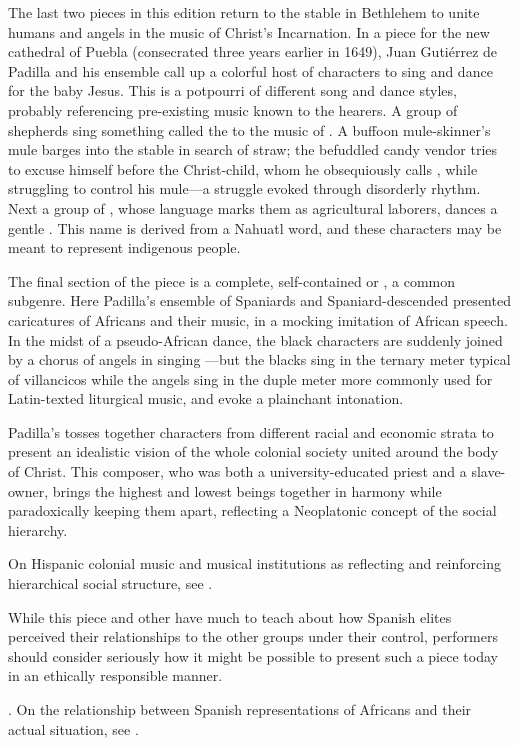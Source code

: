 The last two pieces in this edition return to the stable in Bethlehem to unite 
humans and angels in the music of Christ's Incarnation.
In a piece for the new cathedral of Puebla (consecrated three years earlier in 
1649), Juan Gutiérrez de Padilla and his ensemble call up a colorful host of
characters  to sing and dance for the baby
Jesus.%
    \Autocite[406--467]{Cashner:PhD}
This  is a potpourri of different song and dance styles, 
probably referencing pre-existing music known to the hearers.
A group of shepherds sing something called the  to the music 
of .
A buffoon mule-skinner's mule barges into the stable in search of straw; the 
befuddled candy vendor tries to excuse himself before the Christ-child, whom he 
obsequiously calls , while struggling to control his mule---a 
struggle evoked through disorderly rhythm.
Next a group of , whose language marks them as 
agricultural laborers, dances a gentle .
This name is derived from a Nahuatl word, and these characters may be meant to 
represent indigenous people.

The final section of the piece is a complete, self-contained  or 
, a common subgenre.
Here Padilla's ensemble of Spaniards and Spaniard-descended  
presented caricatures of Africans and their music, in a mocking imitation of 
African speech.
In the midst of a pseudo-African dance, the black characters are suddenly 
joined by a chorus of angels in singing ---but the blacks sing in 
the ternary meter typical of villancicos while the angels sing in the duple
meter more commonly used for Latin-texted liturgical music, and evoke a
plainchant intonation.

Padilla's  tosses together characters from different 
racial and economic strata to present an idealistic vision of the whole 
colonial society united around the body of Christ.
This composer, who was both a university-educated priest and a slave-owner,%
    \Autocite{Mauleon:PadillaPalafox}
brings the highest and lowest beings together in harmony while paradoxically
keeping them apart, reflecting a Neoplatonic concept of the social hierarchy.%
\begin{Footnote}
    On Hispanic colonial music and musical institutions as reflecting and
    reinforcing hierarchical social structure, see
    \Autocites{Baker:Harmony}{Irving:Colonial}
    {Illari:Popular}{RamosKittrell:PlayingCathedral}.
\end{Footnote}
While this piece and other  have much to teach 
about how Spanish elites perceived their relationships to the other groups 
under their control, performers should consider seriously how it might be 
possible to present such a piece today in an ethically responsible manner.%
  \begin{Footnote}
      \Autocites{Baker:EthnicVC}{Baker:PerformancePostColonial}. 
      On the relationship between Spanish
      representations of Africans and their actual situation, see
      \autocites{Fromont:DancingKingCongo}{Molinero:Negros}.
  \end{Footnote}

